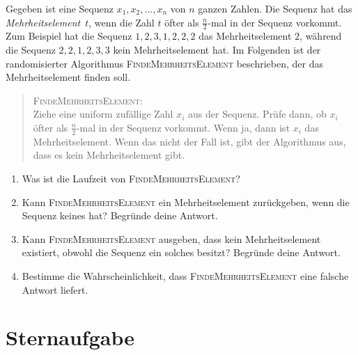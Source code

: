 \documentclass{uebung_cs}
\begin{document}
\begin{exercise}[Mehrheit]
	Gegeben ist eine Sequenz $x_1,x_2,\dots,x_n$ von $n$ ganzen Zahlen. Die Sequenz hat das \textit{Mehrheitselement}~$t$, wenn die Zahl $t$ öfter als $\frac{n}{2}$-mal in der Sequenz vorkommt. Zum Beispiel hat die Sequenz $1,2,3,1,2,2,2$ das Mehrheitselement $2$, während die Sequenz $2,2,1,2,3,3$ kein Mehrheitselement hat. Im Folgenden ist der randomisierter Algorithmus \textsc{FindeMehrheitsElement} beschrieben, der das Mehrheitselement finden soll.
	
	\begin{quote}
		\textsc{FindeMehrheitsElement}: \\
		Ziehe eine uniform zufällige Zahl $x_i$ aus der Sequenz. Prüfe dann, ob $x_i$ öfter als $\frac{n}{2}$-mal in der Sequenz vorkommt. Wenn ja, dann ist $x_i$ das Mehrheitselement. Wenn das nicht der Fall ist, gibt der Algorithmus aus, dass es kein Mehrheitselement gibt.
	\end{quote}
	\begin{enumerate}
		\item Was ist die Laufzeit von \textsc{FindeMehrheitsElement}?
		\item Kann \textsc{FindeMehrheitsElement} ein Mehrheitselement zurückgeben, wenn die Sequenz keines hat? Begründe deine Antwort.
		\item Kann \textsc{FindeMehrheitsElement} ausgeben, dass kein Mehrheitselement existiert, obwohl die Sequenz ein solches besitzt? Begründe deine Antwort.
		\item Bestimme die Wahrscheinlichkeit, dass \textsc{FindeMehrheitsElement} eine falsche Antwort liefert.
	\end{enumerate}
\end{exercise}

\newpage
\section*{Sternaufgabe}
\end{document}
